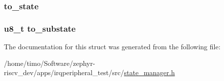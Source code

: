 \subsubsection[{\texorpdfstring{to\+\_\+state}{to_state}}]{ to\+\_\+state}\hypertarget{struct_switch___event_a48cd62cc43f9cdfa13c1408cc8362314}{}\label{struct_switch___event_a48cd62cc43f9cdfa13c1408cc8362314}
\subsubsection[{\texorpdfstring{to\+\_\+substate}{to_substate}}]{\setlength{\rightskip}{0pt plus 5cm}u8\+\_\+t to\+\_\+substate}\hypertarget{struct_switch___event_a40d445d8ea44c266a788ea380c052dda}{}\label{struct_switch___event_a40d445d8ea44c266a788ea380c052dda}


The documentation for this struct was generated from the following file\+:\begin{DoxyCompactItemize}
\item 
/home/timo/\+Software/zephyr-\/riscv\+\_\+dev/apps/irqperipheral\+\_\+test/src/\hyperlink{state__manager_8h}{state\+\_\+manager.\+h}\end{DoxyCompactItemize}
